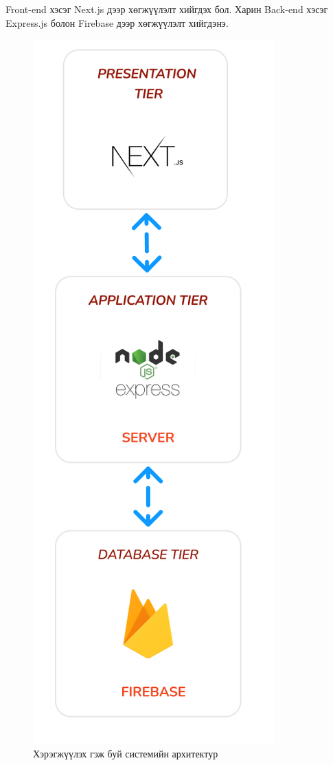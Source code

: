 \clearpage

Front-end хэсэг Next.js дээр хөгжүүлэлт хийгдэх бол. Харин Back-end хэсэг Express.js болон Firebase дээр хөгжүүлэлт хийгдэнэ.

\begin{figure}[h]
	\centering
	\includegraphics[scale=0.9]{images/imp-diag.png}
	\caption{Хэрэгжүүлэх гэж буй системийн архитектур}
	\label{fig:imp-architecture}
\end{figure}


